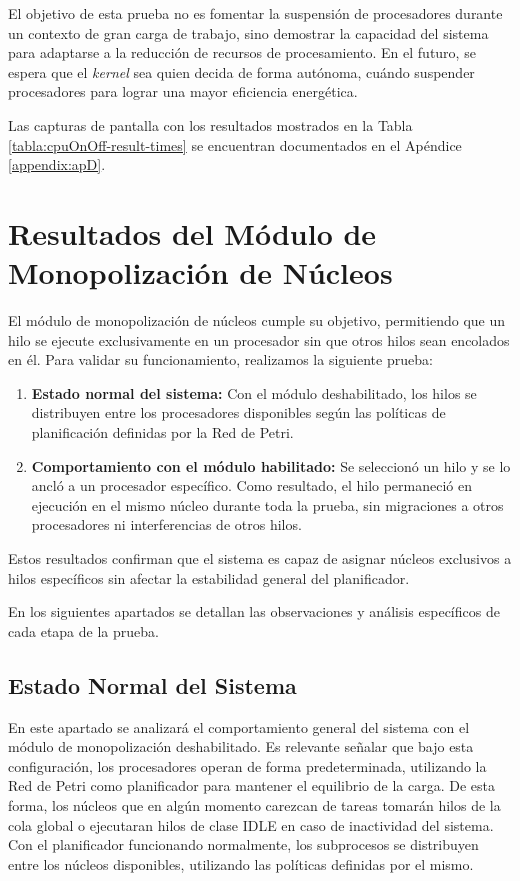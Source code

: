 El objetivo de esta prueba no es fomentar la suspensión de procesadores durante un contexto de gran carga de trabajo, sino demostrar la capacidad del sistema para adaptarse a la reducción de recursos de procesamiento. En el futuro, se espera que el \textit{kernel} sea quien decida de forma autónoma, cuándo suspender procesadores para lograr una mayor eficiencia energética.\par

Las capturas de pantalla con los resultados mostrados en la Tabla \ref{tabla:cpuOnOff-result-times} se encuentran documentados en el Apéndice \ref{appendix:apD}.


\section{Resultados del Módulo de Monopolización de Núcleos}

El módulo de monopolización de núcleos cumple su objetivo, permitiendo que un hilo se ejecute exclusivamente en un procesador sin que otros hilos sean encolados en él. Para validar su funcionamiento, realizamos la siguiente prueba:

\begin{enumerate}
    \item \textbf{Estado normal del sistema:} Con el módulo deshabilitado, los hilos se distribuyen entre los procesadores disponibles según las políticas de planificación definidas por la Red de Petri.
    \item \textbf{Comportamiento con el módulo habilitado:} Se seleccionó un hilo y se lo ancló a un procesador específico. Como resultado, el hilo permaneció en ejecución en el mismo núcleo durante toda la prueba, sin migraciones a otros procesadores ni interferencias de otros hilos.
\end{enumerate}

Estos resultados confirman que el sistema es capaz de asignar núcleos exclusivos a hilos específicos sin afectar la estabilidad general del planificador.\par

En los siguientes apartados se detallan las observaciones y análisis específicos de cada etapa de la prueba.\par

\subsection{Estado Normal del Sistema}

En este apartado se analizará el comportamiento general del sistema con el módulo de monopolización deshabilitado. Es relevante señalar que bajo esta configuración, los procesadores operan de forma predeterminada, utilizando la Red de Petri como planificador para mantener el equilibrio de la carga. De esta forma, los núcleos que en algún momento carezcan de tareas tomarán hilos de la cola global o ejecutaran hilos de clase IDLE en caso de inactividad del sistema. Con el planificador funcionando normalmente, los subprocesos se distribuyen entre los núcleos disponibles, utilizando las políticas definidas por el mismo.\par

